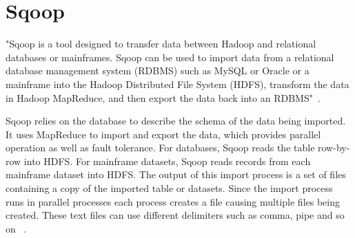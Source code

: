 \section{Sqoop}

"Sqoop is a tool designed to transfer data between Hadoop and 
relational databases or mainframes. Sqoop can be used to import 
data from a relational database management system (RDBMS) such 
as MySQL or Oracle or a mainframe into the Hadoop Distributed 
File System (HDFS), transform the data in Hadoop MapReduce, and 
then export the data back into an RDBMS"~\cite{hid-sp18-517-Sqoop}.

Sqoop relies on the database to describe the schema of the data 
being imported. It uses MapReduce to import and export the data, 
which provides parallel operation as well as fault tolerance. 
For databases, Sqoop reads the table row-by-row into HDFS. 
For mainframe datasets, Sqoop reads records from each mainframe 
dataset into HDFS. The output of this import process is a set of 
files containing a copy of the imported table or datasets. Since 
the import process runs in parallel processes each process 
creates a file causing multiple files being created. These text 
files can use different delimiters such as comma, pipe and so on 
~\cite{hid-sp18-517-Sqoop}.


